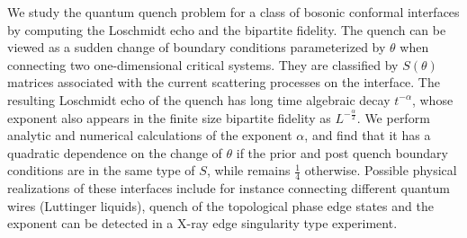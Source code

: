
We study the quantum quench problem for a class of bosonic conformal interfaces by computing the Loschmidt echo and the bipartite fidelity. The quench can be viewed as a sudden change of boundary conditions parameterized by $\theta$ when connecting two one-dimensional critical systems. They are classified by $S(\theta)$ matrices associated with the current scattering processes on the interface. The resulting Loschmidt echo of the quench has long time algebraic decay $t^{-\alpha}$, whose exponent also appears in the finite size bipartite fidelity as $L^{-\frac{\alpha}{2}}$. We perform analytic and numerical calculations of the exponent $\alpha$, and find that it has a quadratic dependence on the change of $\theta$ if the prior and post quench boundary conditions are in the same type of $S$, while remains $\frac{1}{4}$ otherwise. Possible physical realizations of these interfaces include for instance connecting different quantum wires (Luttinger liquids), quench of the topological phase edge states \etc and the exponent can be detected in a X-ray edge singularity type experiment. 


